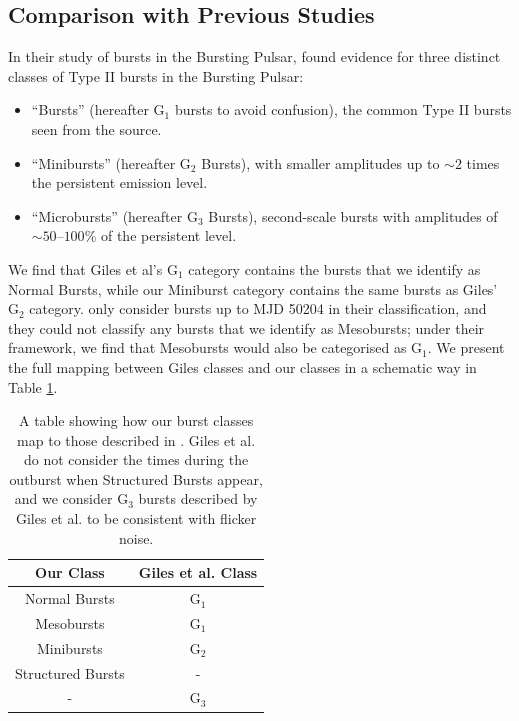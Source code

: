 \subsection{Comparison with Previous Studies}

\par In their study of bursts in the Bursting Pulsar, \citet{Giles_BP} found evidence for three distinct classes of Type II bursts in the Bursting Pulsar:

\begin{itemize}
\item ``Bursts'' (hereafter G$_1$ bursts to avoid confusion), the common Type II bursts seen from the source.
\item ``Minibursts'' (hereafter G$_2$  Bursts), with smaller amplitudes up to $\sim2$ times the persistent emission level.
\item ``Microbursts'' (hereafter G$_3$  Bursts), second-scale bursts with amplitudes of $\sim50$--$100\%$ of the persistent level.
\end{itemize}

We find that Giles et al's G$_1$ category contains the bursts that we identify as Normal Bursts, while our Miniburst category contains the same bursts as Giles' G$_2$ category.  \citet{Giles_BP} only consider bursts up to MJD 50204 in their classification, and they could not classify any bursts that we identify as Mesobursts; under their framework, we find that Mesobursts would also be categorised as G$_1$.  We present the full mapping between Giles classes and our classes in a schematic way in Table \ref{tab:classcomp}.

\begin{table}
\centering
\begin{tabular}{c c}
\hline
\hline
 \scriptsize Our Class & \scriptsize Giles et al. Class  \\
\hline
Normal Bursts & G$_1$ \\
Mesobursts & G$_1$ \\
Minibursts & G$_2$ \\
Structured Bursts & - \\
 - & G$_3$ \\
\hline
\hline
\end{tabular}
\caption[A table showing how our burst classes for the Bursting Pulsar map to those described in \citet{Giles_BP}.]{A table showing how our burst classes map to those described in \citet{Giles_BP}.  Giles et al. do not consider the times during the outburst when Structured Bursts appear, and we consider G$_3$ bursts described by Giles et al. to be consistent with flicker noise.}
\label{tab:classcomp}
\end{table}

